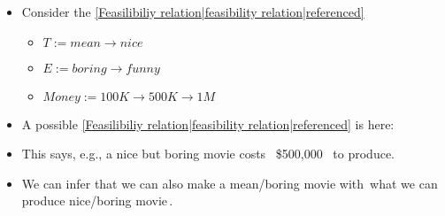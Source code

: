 
\begin{itemize}
    \item Consider the \ref{Feasilibiliy relation|feasibility relation|referenced}
          \begin{itemize}

            \item $T:=\boxed{mean\rightarrow nice}$
            \item $E:=\boxed{boring\rightarrow funny}$
            \item $Money:=\boxed{100 K\rightarrow 500 K \rightarrow 1M}$
          \end{itemize}
    \item A possible \ref{Feasilibiliy relation|feasibility relation|referenced} is here:

    \item This says, e.g., a nice but boring movie costs \, \$500,000 \, to produce.
    \item We can infer that we can also make a mean/boring movie with \,what we can produce nice/boring movie\,.

  \end{itemize}
